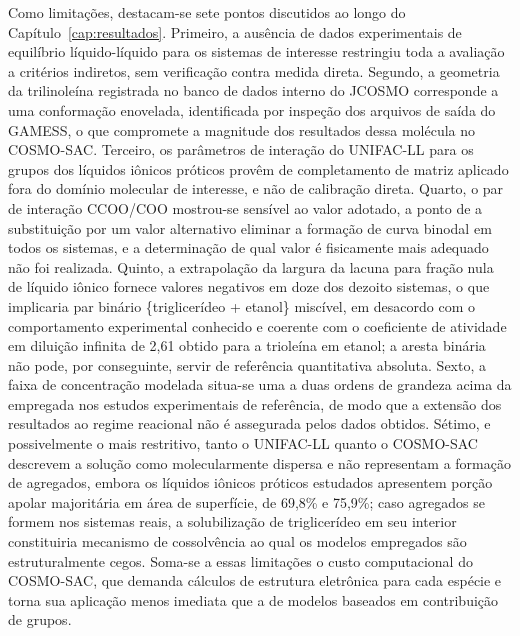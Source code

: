 Como limitações, destacam-se sete pontos discutidos ao longo do Capítulo~\ref{cap:resultados}. Primeiro, a ausência de dados experimentais de equilíbrio líquido-líquido para os sistemas de interesse restringiu toda a avaliação a critérios indiretos, sem verificação contra medida direta. Segundo, a geometria da trilinoleína registrada no banco de dados interno do JCOSMO corresponde a uma conformação enovelada, identificada por inspeção dos arquivos de saída do GAMESS, o que compromete a magnitude dos resultados dessa molécula no COSMO-SAC. Terceiro, os parâmetros de interação do UNIFAC-LL para os grupos dos líquidos iônicos próticos provêm de completamento de matriz aplicado fora do domínio molecular de interesse, e não de calibração direta. Quarto, o par de interação CCOO/COO mostrou-se sensível ao valor adotado, a ponto de a substituição por um valor alternativo eliminar a formação de curva binodal em todos os sistemas, e a determinação de qual valor é fisicamente mais adequado não foi realizada. Quinto, a extrapolação da largura da lacuna para fração nula de líquido iônico fornece valores negativos em doze dos dezoito sistemas, o que implicaria par binário \{triglicerídeo + etanol\} miscível, em desacordo com o comportamento experimental conhecido e coerente com o coeficiente de atividade em diluição infinita de 2,61 obtido para a trioleína em etanol; a aresta binária não pode, por conseguinte, servir de referência quantitativa absoluta. Sexto, a faixa de concentração modelada situa-se uma a duas ordens de grandeza acima da empregada nos estudos experimentais de referência, de modo que a extensão dos resultados ao regime reacional não é assegurada pelos dados obtidos. Sétimo, e possivelmente o mais restritivo, tanto o UNIFAC-LL quanto o COSMO-SAC descrevem a solução como molecularmente dispersa e não representam a formação de agregados, embora os líquidos iônicos próticos estudados apresentem porção apolar majoritária em área de superfície, de 69,8\% e 75,9\%; caso agregados se formem nos sistemas reais, a solubilização de triglicerídeo em seu interior constituiria mecanismo de cossolvência ao qual os modelos empregados são estruturalmente cegos. Soma-se a essas limitações o custo computacional do COSMO-SAC, que demanda cálculos de estrutura eletrônica para cada espécie e torna sua aplicação menos imediata que a de modelos baseados em contribuição de grupos.

